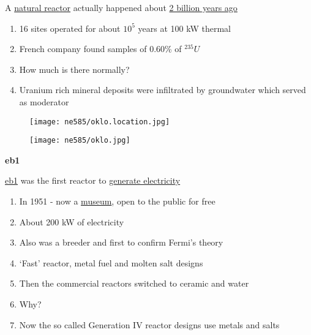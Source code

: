 \documentclass[aspectratio=1610,pdftex,dvipsnames,compress,xcolor={dvipsnames}]{beamer}
\newcommand{\acs}{\acrshort} %
\begin{document}
\addtocounter{framenumber}{-1} 
\begin{frame}{A \href{https://uidaho.pressbooks.pub/nuclearengineering/chapter/nuclear-fuel-cycle-system/}{natural reactor} actually happened about \href{https://uidaho.pressbooks.pub/nuclearengineering/chapter/neutronics/}{2 billion years ago}}
    \begin{enumerate}[series=outerlist,topsep=0pt,itemsep=21pt,leftmargin=*,label=(\arabic*)]
        \item[]16 sites operated for about $10^5$ years at 100 kW thermal
        \item[]French company found samples of 0.60\% of $^{235}U$
        \item[]How much is there normally?
        \item[]Uranium rich mineral deposits were infiltrated by groundwater which served as moderator
    \end{enumerate}
\end{frame}


\begin{frame}{}
    \begin{figure}
        \centering
        \texttt{[image: ne585/oklo.location.jpg]}
    \end{figure}
\end{frame}


\begin{frame}{}
    \begin{figure}
        \centering
        \texttt{[image: ne585/oklo.jpg]}
    \end{figure}
\end{frame}


\begin{frame}[plain]{}
    \centering\LARGE\textbf{\acs{eb1}}
\end{frame}


\addtocounter{framenumber}{-1} 
\begin{frame}{\href{https://uidaho.pressbooks.pub/nuclearengineering/chapter/nuclear-fuel-cycle-system/}{\acs{eb1}} was the first reactor to \href{https://uidaho.pressbooks.pub/nuclearengineering/chapter/fuel-cycle-analysis/}{generate electricity}}
    \begin{enumerate}[series=outerlist,topsep=0pt,itemsep=21pt,leftmargin=*,label=(\arabic*)]
        \item[]In 1951 - now a \href{https://inl.gov/experimental-breeder-reactor-i/}{museum}, open to the public for free
        \item[]About 200 kW of electricity
        \item[]Also was a breeder and first to confirm Fermi’s theory
        \item[]`Fast' reactor, metal fuel and molten salt designs
        \item[]Then the commercial reactors switched to ceramic and water
        \item[]Why?
        \item[]Now the so called Generation IV reactor designs use metals and salts 
    \end{enumerate}
\end{frame}
\end{document}
